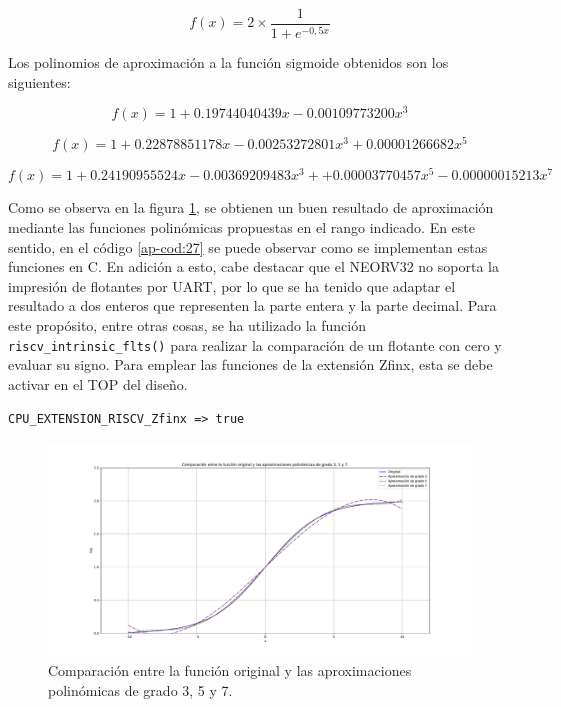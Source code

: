 \begin{equation}\label{ec:3}
f(x)= 2 \times \frac{1}{1 + e^{-0,5x}}\tag{***}
\end{equation}

Los polinomios de aproximación a la función sigmoide obtenidos son los siguientes:

\begin{equation}\label{ec:4}
f(x)= 1 + 0.19744040439x -0.00109773200x^3\tag{****}
\end{equation}


\begin{equation}\label{ec:5}
f(x)= 1 +  0.22878851178x - 0.00253272801x^3 + 0.00001266682x^5\tag{*****}
\end{equation}

\begin{equation}\label{ec:6}
f(x)= 1 + 0.24190955524x - 0.00369209483x^3 + + 0.00003770457x^5 - 0.00000015213x^7 \tag{******}
\end{equation}

Como se observa en la figura \ref{fig:comp}, se obtienen un buen resultado de aproximación mediante las funciones polinómicas propuestas en el rango indicado.
En este sentido, en el código \ref{ap-cod:27} se puede observar como se implementan estas funciones en C.
En adición a esto, cabe destacar que el NEORV32 no soporta la impresión de flotantes por UART, por lo que se ha tenido que adaptar el resultado a dos enteros que representen la parte entera y la parte decimal.
Para este propósito, entre otras cosas, se ha utilizado la función \texttt{riscv_intrinsic_flts()} para realizar la comparación  de un flotante con cero y evaluar su signo.
Para emplear las funciones de la extensión Zfinx, esta se debe activar en el TOP del diseño.

\hspace{32mm} \texttt{CPU_EXTENSION_RISCV_Zfinx => true} 

\begin{figure}[H]
    \hspace*{-38mm}
    \centering
    \includegraphics[width=22cm]{Figuras/Comp_aprox.pdf}
    \caption{Comparación entre la función original y las aproximaciones polinómicas de grado 3, 5 y 7.}
    \label{fig:comp}
\end{figure}

